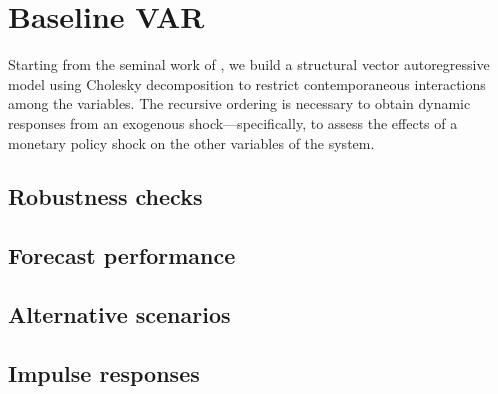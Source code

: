 \section{Baseline VAR}
    Starting from the seminal work of \citet{Sims1992}, we build a structural vector autoregressive model using Cholesky decomposition to restrict contemporaneous interactions among the variables. The recursive ordering is necessary to obtain dynamic responses from an exogenous shock---specifically, to assess the effects of a monetary policy shock on the other variables of the system.
    
    
    \subsection{Robustness checks}
    \subsection{Forecast performance}
        \lipsum[1]
    \subsection{Alternative scenarios}
        \lipsum[1]
    \subsection{Impulse responses}
        \lipsum[1]